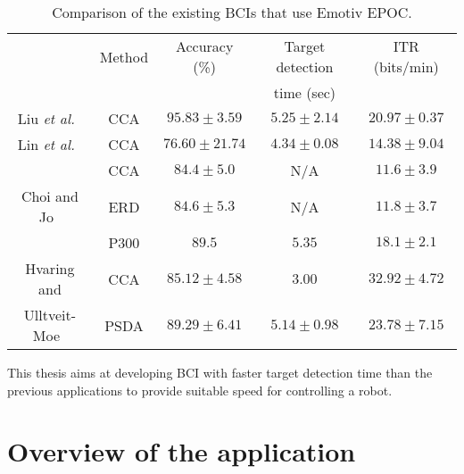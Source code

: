 \newcommand{\liu}{Liu \textit{et al.}~\cite{emotiv_11hz}}
\newcommand{\lin}{Lin \textit{et al.}~\cite{emotiv_walking}}
\newcommand{\choi}{Choi and Jo~\cite{emotiv_hybrid}}
\newcommand{\hvar}{Hvaring and}
\newcommand{\moe}{Ulltveit-Moe~\cite{emotiv_comparison}}
\newcommand{\duvi}{Duvinage \textit{et al.}~\cite{emotiv_p300_comp}}

\begin{table}[h]
	\centering
	\begin{tabular}{|c|c|c|c|c|}\hline
		& Method& Accuracy (\%)		& Target detection 	& ITR (bits/min)	\\
		&		&					& time (sec)		&					\\\hline
\liu	& CCA	& $95.83\pm 3.59$	& $5.25\pm 2.14$	& $20.97\pm 0.37$	\\\hline
\lin	& CCA	& $76.60\pm 21.74$	& $4.34\pm 0.08$	& $14.38\pm 9.04$	\\\hline
		& CCA	& $84.4\pm 5.0$		& N/A				& $11.6\pm 3.9$		\\\cline{2-5}
\choi	& ERD	& $84.6\pm 5.3$		& N/A				& $11.8\pm 3.7$		\\\cline{2-5}
		& P300	& $89.5$			& $5.35$			& $18.1\pm 2.1$		\\\hline
\hvar	& CCA	& $85.12\pm 4.58$	& $3.00$			& $32.92\pm 4.72$	\\\cline{2-5}
\moe	& PSDA	& $89.29\pm 6.41$	& $5.14\pm 0.98$	& $23.78\pm 7.15$	\\\hline
	\end{tabular}
	\caption{Comparison of the existing BCIs that use Emotiv EPOC.}
	\label{tab:emotiv_BCIs}
\end{table}

This thesis aims at developing \gls{BCI} with faster \gls{target} detection time than the previous applications to provide suitable speed for controlling a robot.

\section{Overview of the application}
\label{sec:application}

